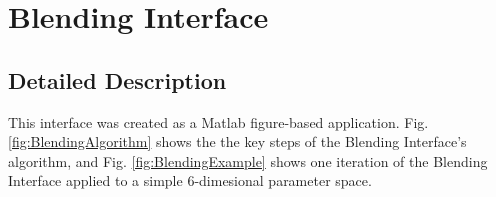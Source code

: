 \documentclass[11pt, oneside]{report}   	%
\begin{document}

\pagebreak
\section{Blending Interface}
\subsection{Detailed Description}\label{sec:BlendingDescription}
This interface was created as a Matlab figure-based application. Fig. \ref{fig:BlendingAlgorithm} shows the the key steps of the Blending Interface's algorithm, and Fig. \ref{fig:BlendingExample} shows one iteration of the Blending Interface applied to a simple 6-dimesional parameter space.
\end{document}
